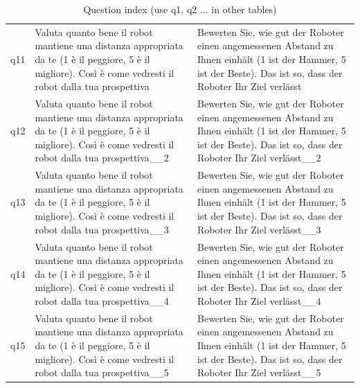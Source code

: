\begin{table}[ht]
\begin{tabular}{lll}
q11 & Valuta quanto bene il robot mantiene una distanza appropriata da te  (1 è il peggiore, 5 è il migliore). Così è come vedresti il robot dalla tua prospettiva & Bewerten Sie, wie gut der Roboter einen angemessenen Abstand zu Ihnen einhält (1 ist der Hammer, 5 ist der Beste). Das ist so, dass der Roboter Ihr Ziel verlässt \\
q12 & Valuta quanto bene il robot mantiene una distanza appropriata da te  (1 è il peggiore, 5 è il migliore). Così è come vedresti il robot dalla tua prospettiva__2 & Bewerten Sie, wie gut der Roboter einen angemessenen Abstand zu Ihnen einhält (1 ist der Hammer, 5 ist der Beste). Das ist so, dass der Roboter Ihr Ziel verlässt__2 \\
q13 & Valuta quanto bene il robot mantiene una distanza appropriata da te  (1 è il peggiore, 5 è il migliore). Così è come vedresti il robot dalla tua prospettiva__3 & Bewerten Sie, wie gut der Roboter einen angemessenen Abstand zu Ihnen einhält (1 ist der Hammer, 5 ist der Beste). Das ist so, dass der Roboter Ihr Ziel verlässt__3 \\
q14 & Valuta quanto bene il robot mantiene una distanza appropriata da te  (1 è il peggiore, 5 è il migliore). Così è come vedresti il robot dalla tua prospettiva__4 & Bewerten Sie, wie gut der Roboter einen angemessenen Abstand zu Ihnen einhält (1 ist der Hammer, 5 ist der Beste). Das ist so, dass der Roboter Ihr Ziel verlässt__4 \\
q15 & Valuta quanto bene il robot mantiene una distanza appropriata da te  (1 è il peggiore, 5 è il migliore). Così è come vedresti il robot dalla tua prospettiva__5 & Bewerten Sie, wie gut der Roboter einen angemessenen Abstand zu Ihnen einhält (1 ist der Hammer, 5 ist der Beste). Das ist so, dass der Roboter Ihr Ziel verlässt__5 \\
\bottomrule
\end{tabular}
\caption{Question index (use q1, q2 ... in other tables)}\n\label{tab:questions_index}\n\end{table}
